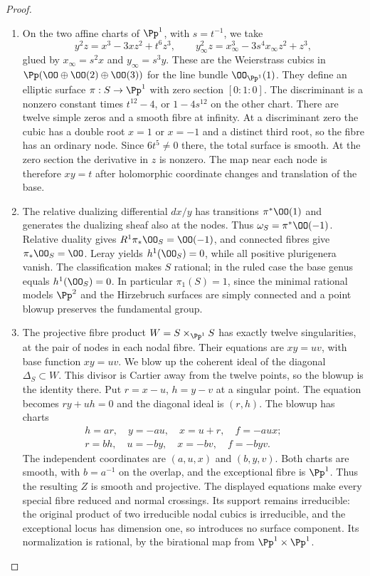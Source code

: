 \begin{proof}

\begin{enumerate}[label={$\langle1\rangle$\arabic*.},leftmargin=*]
\item On the two affine charts of $\Pp^1$, with $s=t^{-1}$, we take
\[
 y^2z=x^3-3xz^2+t^6z^3,\qquad
 y_\infty^2z=x_\infty^3-3s^4x_\infty z^2+z^3,
\]
glued by $x_\infty=s^2x$ and $y_\infty=s^3y$. These are the
Weierstrass cubics in $\Pp(\OO\oplus\OO(2)\oplus\OO(3))$ for
the line bundle $\OO_{\Pp^1}(1)$. They define an elliptic surface
$\pi:S\to\Pp^1$ with zero section $[0:1:0]$. The discriminant
is a nonzero constant times $t^{12}-4$, or $1-4s^{12}$ on the
other chart. There are twelve simple zeros and a smooth fibre at
infinity. At a discriminant zero the cubic has a double root
$x=1$ or $x=-1$ and a distinct third root, so the fibre has an
ordinary node. Since $6t^5\ne0$ there, the total surface is smooth.
At the zero section the derivative in $z$ is nonzero. The map near
each node is therefore $xy=t$ after holomorphic coordinate changes
and translation of the base.

\item The relative dualizing differential $dx/y$ has transitions
$\pi^*\OO(1)$ and generates the dualizing sheaf also at the nodes.
Thus $\omega_S=\pi^*\OO(-1)$. Relative duality gives
$R^1\pi_*\OO_S=\OO(-1)$, and connected fibres give
$\pi_*\OO_S=\OO$. Leray yields $h^1(\OO_S)=0$, while all
positive plurigenera vanish. The classification \cite[Chapter~VI, Theorem~1.1, p.~243]{BHPV2004E} makes $S$
rational; in the ruled case the base genus equals $h^1(\OO_S)=0$.
In particular $\pi_1(S)=1$, since the minimal rational models
$\Pp^2$ and the Hirzebruch surfaces are simply connected and a
point blowup preserves the fundamental group.

\item The projective fibre product $W=S\times_{\Pp^1}S$ has exactly
twelve singularities, at the pair of nodes in each nodal fibre.
Their equations are $xy=uv$, with base function $xy=uv$. We blow
up the coherent ideal of the diagonal $\Delta_S\subset W$. This
divisor is Cartier away from the twelve points, so the blowup is
the identity there. Put $r=x-u$, $h=y-v$ at a singular point.
The equation becomes $ry+uh=0$ and the diagonal ideal is $(r,h)$.
The blowup has charts
\label{layout:II:1}
\[
\begin{gathered}
h=ar,\quad y=-au,\quad x=u+r,\quad f=-aux;
 \qquad
 \\
r=bh,\quad u=-by,\quad x=-bv,\quad f=-byv.
\end{gathered}
\]
The independent coordinates are $(a,u,x)$ and $(b,y,v)$.
Both charts are smooth, with $b=a^{-1}$ on the overlap, and the
exceptional fibre is $\Pp^1$. Thus the resulting $Z$ is smooth
and projective. The displayed equations make every special fibre
reduced and normal crossings. Its support remains irreducible:
the original product of two irreducible nodal cubics is irreducible,
and the exceptional locus has dimension one, so introduces no
surface component. Its normalization is rational, by the
birational map from $\Pp^1\times\Pp^1$.


\end{enumerate}
\end{proof}
